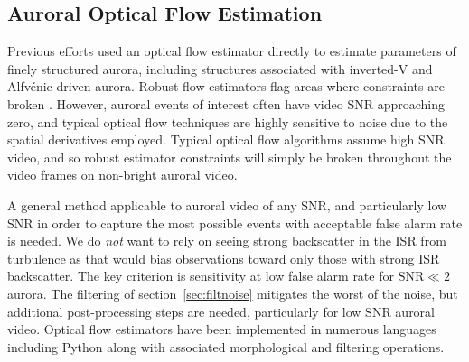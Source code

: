 \subsection{Auroral Optical Flow Estimation}\label{sec:of}
Previous efforts \citep{blixt2006} used an optical flow estimator directly to estimate parameters of finely structured aurora, including structures associated with inverted-V and Alfvénic driven aurora.
Robust flow estimators flag areas where constraints are broken \citep{black1996}.
However, auroral events of interest often have video SNR approaching zero, and typical optical flow techniques are highly sensitive to noise due to the spatial derivatives employed.
Typical optical flow algorithms assume high SNR video, and so robust estimator constraints will simply be broken throughout the video frames on non-bright auroral video. 

A general method applicable to auroral video of any SNR, and particularly low SNR in order to capture the most possible events with acceptable false alarm rate is needed.
We do \textit{not} want to rely on seeing strong backscatter in the ISR from turbulence as that would bias observations toward only those with strong ISR backscatter.
The key criterion is sensitivity at low false alarm rate for $\textrm{SNR}\ll 2$ aurora.
The filtering of section~\ref{sec:filtnoise} mitigates the worst of the noise, but additional post-processing steps are needed, particularly for low SNR auroral video.
Optical flow estimators \citep{hornschunck} have been implemented in numerous languages including Python \citep{hscode} along with associated morphological and filtering operations.


